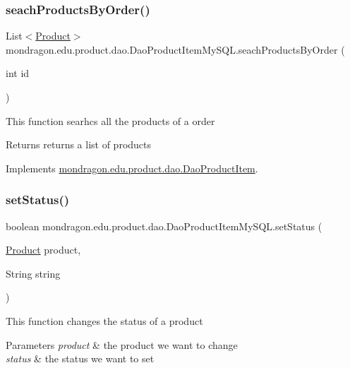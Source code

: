 \subsubsection{\texorpdfstring{seachProductsByOrder()}{seachProductsByOrder()}}
{\footnotesize\ttfamily List$<$\mbox{\hyperlink{classmondragon_1_1edu_1_1clases_1_1_product}{Product}}$>$ mondragon.\+edu.\+product.\+dao.\+Dao\+Product\+Item\+My\+S\+Q\+L.\+seach\+Products\+By\+Order (\begin{DoxyParamCaption}\item[{int}]{id }\end{DoxyParamCaption})\hspace{0.3cm}{\ttfamily [inline]}}

This function searhcs all the products of a order

\begin{DoxyReturn}{Returns}
returns a list of products 
\end{DoxyReturn}


Implements \mbox{\hyperlink{interfacemondragon_1_1edu_1_1product_1_1dao_1_1_dao_product_item}{mondragon.\+edu.\+product.\+dao.\+Dao\+Product\+Item}}.

\mbox{\label{classmondragon_1_1edu_1_1product_1_1dao_1_1_dao_product_item_my_s_q_l_a213e0f08b6cc25eff27930673c532214}} 
\subsubsection{\texorpdfstring{setStatus()}{setStatus()}}
{\footnotesize\ttfamily boolean mondragon.\+edu.\+product.\+dao.\+Dao\+Product\+Item\+My\+S\+Q\+L.\+set\+Status (\begin{DoxyParamCaption}\item[{\mbox{\hyperlink{classmondragon_1_1edu_1_1clases_1_1_product}{Product}}}]{product,  }\item[{String}]{string }\end{DoxyParamCaption})\hspace{0.3cm}{\ttfamily [inline]}}

This function changes the status of a product


\begin{DoxyParams}{Parameters}
{\em product} & the product we want to change \\
\hline
{\em status} & the status we want to set \\
\hline
\end{DoxyParams}



